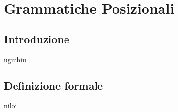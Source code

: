 \chapter{Grammatiche Posizionali}
\section{Introduzione}
uguihiu
\section{Definizione formale}
niloi

